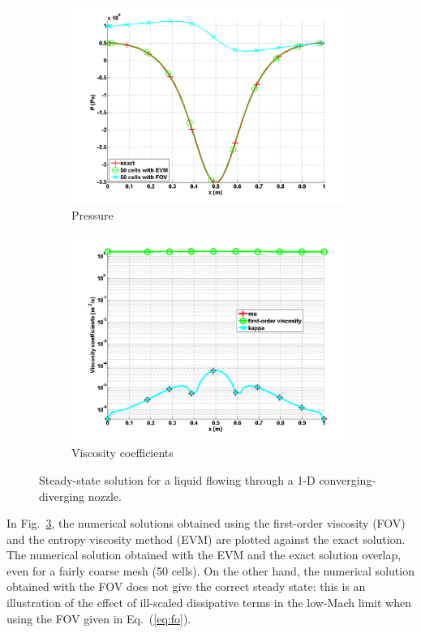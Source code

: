 \documentclass[review,10pt]{elsarticle}
\newcommand{\eqt}[1]{Eq.~(\ref{#1})}                     %
\newcommand{\fig}[1]{Fig.~\ref{#1}}                      %
\begin{document}
\begin{figure}[H]
        \begin{subfigure}[b]{0.495\textwidth}
                \centering
                \includegraphics[width=\textwidth]{figures/liquid_pressure_numerical_and_exact_50.png}
                \caption{Pressure}
                \label{fig:1d_nozzle_liq_press}
        \end{subfigure}        
        \begin{subfigure}[b]{0.495\textwidth}
                \centering
                \includegraphics[width=\textwidth]{figures/liquid_viscosity_numerical50.png}
                \caption{Viscosity coefficients}
                \label{fig:1d_nozzle_liq_visc}
        \end{subfigure}
        \caption{Steady-state solution for a liquid flowing through a 1-D converging-diverging nozzle.}\label{fig:1d_liq_nozzle}
\end{figure}
%
In \fig{fig:1d_liq_nozzle}, the numerical solutions obtained using the first-order viscosity (FOV) and the entropy 
viscosity method (EVM) are plotted against the exact solution. The numerical solution obtained with the EVM and the 
exact solution overlap, even for a fairly coarse mesh (50 cells).
On the other hand, the numerical solution obtained with the FOV does not give the correct steady state: this is an 
illustration of the effect of ill-scaled dissipative terms in the low-Mach limit when using the FOV given in \eqt{eq:fo}.
\end{document}

